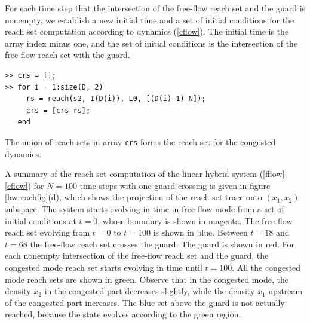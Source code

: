 For each time step that the intersection of the free-flow reach set and the
guard is nonempty, we establish a new initial time and a set of initial
conditions for the reach set computation according to dynamics (\ref{cflow}).
The initial time is the array index minus one, and the set of initial
conditions is the intersection of the free-flow reach set with the guard.
{\tt \begin{verbatim}
>> crs = [];
>> for i = 1:size(D, 2)
     rs = reach(s2, I(D(i)), L0, [(D(i)-1) N]);
     crs = [crs rs];
   end
\end{verbatim}}
The union of reach sets in array {\tt crs} forms the reach set for
the congested dynamics.

A summary of the reach set computation of the
linear hybrid system (\ref{fflow}-\ref{cflow}) for $N=100$ time steps
with one guard crossing is given in figure \ref{hwreachfig}(d),
which shows the projection of the reach set trace onto $(x_1,x_2)$ subspace.
The system starts evolving in time in free-flow mode from a set of
initial conditions at $t=0$, whose boundary is shown in magenta.
The free-flow reach set evolving from $t=0$ to $t=100$ is shown in blue.
Between  $t=18$ and $t=68$ the free-flow reach set crosses the guard.
The guard is shown in red.
For each  nonempty intersection of the free-flow reach set and the guard,
the congested mode reach set starts evolving in time until $t=100$.
All the congested mode reach sets are shown in green.
Observe that in the congested mode, the density $x_2$ in the congested part
 decreases slightly, while the density $x_1$ upstream of the congested part
 increases.
The blue  set above the guard is not actually reached,
because the state evolves according to the green region.





